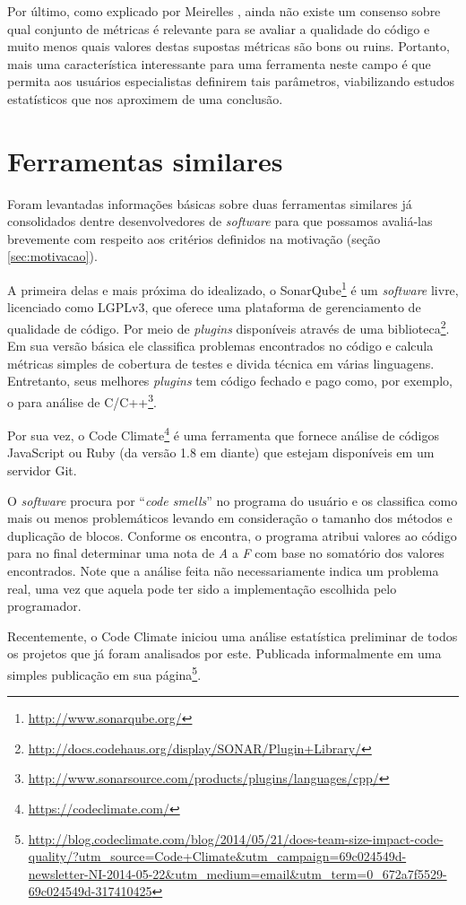 \documentclass{llncs}
\begin{document}
Por último, como explicado por Meirelles \cite{m13}, ainda não existe um consenso sobre qual conjunto de métricas é relevante para se avaliar a qualidade do código e muito menos quais valores destas supostas métricas são bons ou ruins. Portanto, mais uma característica interessante para uma ferramenta neste campo é que permita aos usuários especialistas definirem tais parâmetros, viabilizando estudos estatísticos que nos aproximem de uma conclusão.

\section{Ferramentas similares}
Foram levantadas informações básicas sobre duas ferramentas similares já consolidados dentre desenvolvedores de \textit{software} para que possamos avaliá-las brevemente com respeito aos critérios definidos na motivação (seção \ref{sec:motivacao}).

A primeira delas e mais próxima do idealizado, o SonarQube\footnote{\url{http://www.sonarqube.org/}} é um \textit{software} livre, licenciado como LGPLv3, que oferece uma plataforma de gerenciamento de qualidade de código. Por meio de \textit{plugins} disponíveis através de uma biblioteca\footnote{\url{http://docs.codehaus.org/display/SONAR/Plugin+Library/}}. Em sua versão básica ele classifica problemas encontrados no código e calcula métricas simples de cobertura de testes e divida técnica em várias linguagens. Entretanto, seus melhores \textit{plugins} tem código fechado e pago como, por exemplo, o para análise de C/C++\footnote{\url{http://www.sonarsource.com/products/plugins/languages/cpp/}}.

Por sua vez, o Code Climate\footnote{\url{https://codeclimate.com/}} é uma ferramenta que fornece análise de códigos JavaScript ou Ruby (da versão 1.8 em diante) que estejam disponíveis em um servidor Git.

O \textit{software} procura por ``\textit{code smells}'' no programa do usuário e os classifica como mais ou menos problemáticos levando em consideração o tamanho dos métodos e duplicação de blocos. Conforme os encontra, o programa atribui valores ao código para no final determinar uma nota de \textit{A} a \textit{F} com base no somatório dos valores encontrados. Note que a análise feita não necessariamente indica um problema real, uma vez que aquela pode ter sido a implementação escolhida pelo programador.

Recentemente, o Code Climate iniciou uma análise estatística preliminar de todos os projetos que já foram analisados por este. Publicada informalmente em uma simples publicação em sua página\footnote{\url{http://blog.codeclimate.com/blog/2014/05/21/does-team-size-impact-code-quality/?utm_source=Code+Climate&utm_campaign=69c024549d-newsletter-NI-2014-05-22&utm_medium=email&utm_term=0_672a7f5529-69c024549d-317410425}}.
\end{document}
